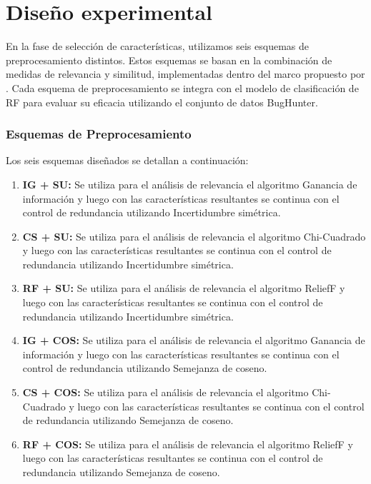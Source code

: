 \section{Diseño experimental}
\label{sec:diseno}
En la fase de selección de características, utilizamos seis esquemas de preprocesamiento distintos. Estos esquemas se basan en la combinación de medidas de relevancia y similitud, implementadas dentro del marco propuesto por \cite{liu_empirical_2015}. Cada esquema de preprocesamiento se integra con el modelo de clasificación de RF para evaluar su eficacia utilizando el conjunto de datos BugHunter.

\subsubsection{Esquemas de Preprocesamiento}

Los seis esquemas diseñados se detallan a continuación:

\begin{enumerate}
    \item \textbf{IG + SU:} Se utiliza para el análisis de relevancia el algoritmo Ganancia de información y luego con las características resultantes se continua con el control de redundancia utilizando Incertidumbre simétrica.
    \item \textbf{CS + SU:} Se utiliza para el análisis de relevancia el algoritmo Chi-Cuadrado  y luego con las características resultantes se continua con el control de redundancia utilizando Incertidumbre simétrica.
    \item \textbf{RF + SU:} Se utiliza para el análisis de relevancia el algoritmo ReliefF y luego con las características resultantes se continua con el control de redundancia utilizando Incertidumbre simétrica.
    \item \textbf{IG + COS:} Se utiliza para el análisis de relevancia el algoritmo Ganancia de información y luego con las características resultantes se continua con el control de redundancia utilizando Semejanza de coseno.
    \item \textbf{CS + COS:} Se utiliza para el análisis de relevancia el algoritmo Chi-Cuadrado y luego con las características resultantes se continua con el control de redundancia utilizando Semejanza de coseno.
    \item \textbf{RF + COS:} Se utiliza para el análisis de relevancia el algoritmo ReliefF y luego con las características resultantes se continua con el control de redundancia utilizando Semejanza de coseno.
\end{enumerate}

